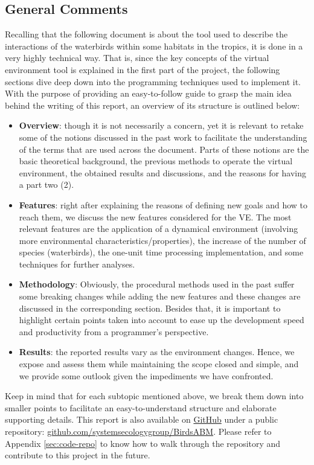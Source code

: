 \subsection{General Comments}
Recalling that the following document is about the tool used to describe the interactions of the waterbirds within some habitats in the tropics, it is done in a very highly technical way. That is, since the key concepts of the virtual environment tool is explained in the first part of the project, the following sections dive deep down into the programming techniques used to implement it. With the purpose of providing an easy-to-follow guide to grasp the main idea behind the writing of this report, an overview of its structure is outlined below:
\begin{itemize}
    \item \textbf{Overview}: though it is not necessarily a concern, yet it is relevant to retake some of the notions discussed in the past work to facilitate the understanding of the terms that are used across the document. Parts of these notions are the basic theoretical background, the previous methods to operate the virtual environment, the obtained results and discussions, and the reasons for having a part two (2).
    \item \textbf{Features}: right after explaining the reasons of defining new goals and how to reach them, we discuss the new features considered for the VE. The most relevant features are the application of a dynamical environment (involving more environmental characteristics/properties), the increase of the number of species (waterbirds), the one-unit time processing implementation, and some techniques for further analyses.
    \item \textbf{Methodology}: Obviously, the procedural methods used in the past suffer some breaking changes while adding the new features and these changes are discussed in the corresponding section. Besides that, it is important to highlight certain points taken into account to ease up the development speed and productivity from a programmer's perspective.
    \item \textbf{Results}: the reported results vary as the environment changes. Hence, we expose and assess them while maintaining the scope closed and simple, and we provide some outlook given the impediments we have confronted.
\end{itemize}

Keep in mind that for each subtopic mentioned above, we break them down into smaller points to facilitate an easy-to-understand structure and elaborate supporting details. This report is also available on \href{https://github.com/}{GitHub} under a public repository: \href{https://github.com/systemsecologygroup/BirdsABM}{github.com/systemsecologygroup/BirdsABM}. Please refer to Appendix \ref{sec:code-repo} to know how to walk through the repository and contribute to this project in the future.
